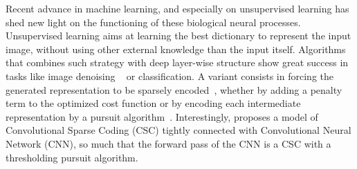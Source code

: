\documentclass[draft]{article} %
\begin{document}
Recent advance in machine learning, and especially on unsupervised learning has shed new light on the functioning of these biological neural processes.
Unsupervised learning aims at learning the best dictionary to represent the input image, without using other external knowledge than the input itself. Algorithms that combines such strategy with deep layer-wise structure show great success in tasks like image denoising ~\citep{Vincent08} or classification. A variant consists in forcing the generated representation to be sparsely encoded~\citep{MakhzaniF13}, whether by adding a penalty term to the optimized cost function or by encoding each intermediate representation by a pursuit algorithm~\citep{Papyan16}. Interestingly, \citep{Papyan16} proposes a model of Convolutional Sparse Coding (CSC) tightly connected with Convolutional Neural Network (CNN), so much that the forward pass of the CNN is a CSC with a thresholding pursuit algorithm.
\end{document}
